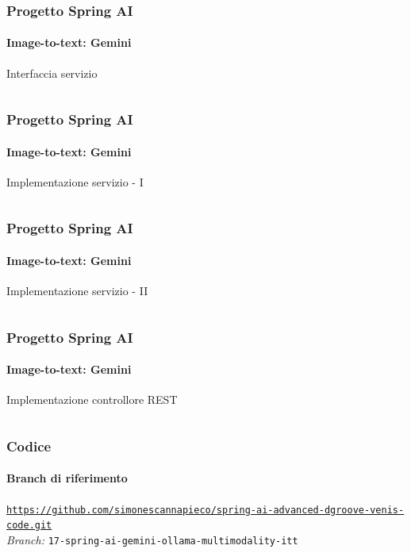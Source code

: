 %
\begin{frame}[t,fragile] \frametitle{Progetto Spring AI}
    \framesubtitle{Image-to-text: Gemini}
        \begin{block}{Interfaccia servizio}
			{\tiny\inputminted{java}{code/MultimodalityService.java}}
    	\end{block}
\end{frame}
%
\begin{frame}[t,fragile] \frametitle{Progetto Spring AI}
    \framesubtitle{Image-to-text: Gemini}
    \vspace*{-.7cm}
    \begin{block}{Implementazione servizio - I}
		{\tiny\inputminted{java}{code/MultimodalityServiceImpl.java}}
    \end{block}
\end{frame}
%
\begin{frame}[t,fragile] \frametitle{Progetto Spring AI}
    \framesubtitle{Image-to-text: Gemini}
    \begin{block}{Implementazione servizio - II}
		{\tiny\inputminted{java}{code/MultimodalityServiceImpl-2.java}}
    \end{block}
\end{frame}
%
\begin{frame}[t,fragile] \frametitle{Progetto Spring AI}
    \framesubtitle{Image-to-text: Gemini}
    	\vspace*{-.7cm}
        \begin{block}{Implementazione controllore REST}
			{\tiny\inputminted{java}{code/GeminiMultimodalityController.java}}
    	\end{block}
\end{frame}
%
\begin{frame}[fragile] \frametitle{Codice}
    \framesubtitle{Branch di riferimento}
	\begin{center}
		{\scriptsize \href{https://github.com/simonescannapieco/spring-ai-advanced-dgroove-venis-code.git}{\texttt{https://github.com/simonescannapieco/spring-ai-advanced-dgroove-venis-code.git}}}\\
		\textit{Branch:} \alert{\texttt{17-spring-ai-gemini-ollama-multimodality-itt}}
	\end{center}
\end{frame}